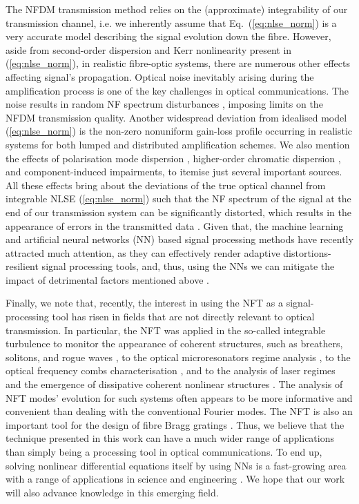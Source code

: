 The NFDM transmission method relies on the (approximate) integrability of our transmission channel, i.e. we inherently assume that Eq.~(\ref{eq:nlse_norm}) is a very accurate model describing the signal evolution down the fibre. However, aside from second-order dispersion and Kerr nonlinearity present in (\ref{eq:nlse_norm}), in realistic fibre-optic systems, there are numerous other effects affecting signal's propagation. Optical noise inevitably arising during the amplification process \cite{a12} is one of the key challenges in optical communications. The noise results in random NF spectrum disturbances \cite{dpt16,pvd20}, imposing limits on the NFDM transmission quality.  Another widespread deviation from idealised model (\ref{eq:nlse_norm}) is the non-zero nonuniform gain-loss profile occurring in realistic systems for both lumped \cite{lpt15,kplt17_2} and distributed \cite{lpr15} amplification schemes. We also mention the effects of polarisation mode dispersion \cite{ylb17,ts19}, higher-order chromatic dispersion \cite{ylb17}, and component-induced impairments, to itemise just several important sources. All these effects bring about the deviations of the true optical channel from integrable NLSE (\ref{eq:nlse_norm}) such that the NF spectrum of the signal at the end of our transmission system can be significantly distorted, which results in the appearance of errors in the transmitted data \cite{lpphet16,lab17,ylb17}.  Given that,  the machine learning and artificial neural networks (NN) based signal processing methods have recently attracted much attention, as they can effectively render adaptive distortions-resilient signal processing tools, and, thus, using the NNs we can mitigate the impact of detrimental factors mentioned above \cite{mrn18,kfl19}.  


Finally, we note that, recently, the interest in using the NFT as a signal-processing tool has risen in fields that are not directly relevant to optical transmission. In particular, the NFT was applied in the so-called integrable turbulence to monitor the appearance of coherent structures, such as breathers, solitons, and rogue waves \cite{rsc18,sda16}, to the optical microresonators regime analysis \cite{tcf20}, to the optical frequency combs characterisation \cite{wsh20}, and to the analysis of laser regimes and the emergence of dissipative coherent nonlinear structures \cite{rnb18,skp19,csf19}. The analysis of NFT modes' evolution for such systems often appears to be more informative and convenient than dealing with the conventional Fourier modes. The NFT is also an important tool for the design of fibre Bragg gratings \cite{FBG01,FBG02}. Thus, we believe that the technique presented in this work can have a much wider range of applications than simply being a processing tool in optical communications. To end up, solving nonlinear differential equations itself by using NNs is a fast-growing area with a range of applications in science and engineering \cite{rbp17,lkb18,lka20}. We hope that our work will also advance knowledge in this emerging field.

